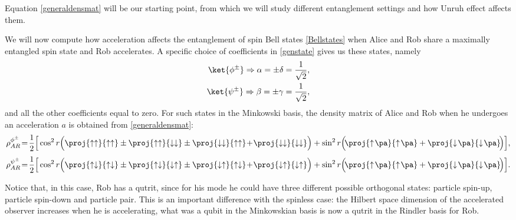 Equation \eqref{generaldensmat} will be our starting point, from which we will study different entanglement settings and how Unruh effect affects them.

We will now compute how acceleration affects the entanglement of spin Bell states \eqref{Bellstates} when Alice and Rob share a maximally entangled spin state and Rob accelerates. A specific choice of coefficients in \eqref{genstate} gives us these states, namely
\begin{align}
\ket{\phi^\pm}\Rightarrow \alpha=\pm\delta=\frac{1}{\sqrt{2}},\\*
\ket{\psi^\pm}\Rightarrow \beta=\pm\gamma=\frac{1}{\sqrt{2}},
\end{align}
and all the other coefficients equal to zero. For such states in the Minkowski basis, the density matrix of Alice and Rob when he undergoes an acceleration $a$ is obtained from \eqref{generaldensmat}:
\begin{equation}\label{Phibell}
\rho^{\phi^\pm}_{AR}\!=\!\frac12\Big[\cos^2 r\Big(\proj{\uparrow\uparrow}{\uparrow\uparrow}\pm\proj{\uparrow\uparrow}{\downarrow\downarrow}\pm\proj{\downarrow\downarrow}{\uparrow\uparrow}\!+\!\proj{\downarrow\downarrow}{\downarrow\downarrow}\Big)+\sin^2 r\Big(\!\proj{\uparrow\!\pa}{\uparrow\!\pa}+\proj{\downarrow\!\pa}{\downarrow\!\pa}\!\Big)\Big],
\end{equation}
\begin{equation}\label{Psibell}
\rho^{\psi^\pm}_{AR}\!=\!\frac12\Big[\cos^2 r\Big(\proj{\uparrow\downarrow}{\uparrow\downarrow}\pm\proj{\uparrow\downarrow}{\downarrow\uparrow}\pm\proj{\downarrow\uparrow}{\uparrow\downarrow}\!+\!\proj{\downarrow\uparrow}{\downarrow\uparrow}\Big)+\sin^2 r\Big(\!\proj{\uparrow\!\pa}{\uparrow\!\pa}+\proj{\downarrow\!\pa}{\downarrow\!\pa}\!\Big)\Big].
\end{equation}

Notice that, in this case, Rob has a qutrit, since for his mode he could have three different possible orthogonal states: particle spin-up, particle spin-down and particle pair. This is an important difference with the spinless case: the Hilbert space dimension of the accelerated observer increases when he is accelerating, what was a qubit in the Minkowskian basis is now a qutrit in the Rindler basis for Rob.

